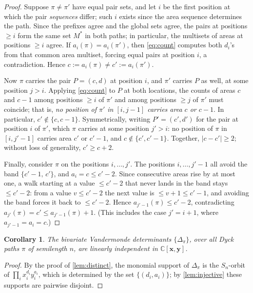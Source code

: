 \documentclass[12pt,reqno]{amsart}
\newtheorem{cor}{Corollary}
\theoremstyle{definition}
\newcommand{\C}{\mathbb C}
\newcommand{\x}{\mathbf x}
\newcommand{\y}{\mathbf y}
\begin{document}
\begin{proof}
Suppose $\pi \neq \pi'$ have equal pair sets, and let $i$ be the first position at which the pair \emph{sequences} differ; such $i$ exists since the area sequence determines the path. Since the prefixes agree and the global sets agree, the pairs at positions $\geq i$ form the same set $M^\ast$ in both paths; in particular, the multisets of areas at positions $\geq i$ agree. If $a_i(\pi) = a_i(\pi')$, then \eqref{eq:count} computes both $d_i$'s from that common area multiset, forcing equal pairs at position $i$, a contradiction. Hence $c := a_i(\pi) \neq c' := a_i(\pi')$.

Now $\pi$ carries the pair $P = (c, d)$ at position $i$, and $\pi'$ carries $P$ as well, at some position $j > i$. Applying \eqref{eq:count} to $P$ at both locations, the counts of areas $c$ and $c-1$ among positions $\geq i$ of $\pi'$ and among positions $\geq j$ of $\pi'$ must coincide; that is, \emph{no position of $\pi'$ in $[i, j-1]$ carries area $c$ or $c-1$}. In particular, $c' \notin \{c, c-1\}$. Symmetrically, writing $P' = (c', d')$ for the pair at position $i$ of $\pi'$, which $\pi$ carries at some position $j' > i$: no position of $\pi$ in $[i, j'-1]$ carries area $c'$ or $c'-1$, and $c \notin \{c', c'-1\}$. Together, $|c - c'| \geq 2$; without loss of generality, $c' \geq c + 2$.

Finally, consider $\pi$ on the positions $i, \dots, j'$. The positions $i, \dots, j'-1$ all avoid the band $\{c'-1,\, c'\}$, and $a_i = c \leq c' - 2$. Since consecutive areas rise by at most one, a walk starting at a value $\leq c'-2$ that never lands in the band stays $\leq c'-2$: from a value $v \leq c'-2$ the next value is $\leq v + 1 \leq c'-1$, and avoiding the band forces it back to $\leq c'-2$. Hence $a_{j'-1}(\pi) \leq c'-2$, contradicting $a_{j'}(\pi) = c' \leq a_{j'-1}(\pi) + 1$. (This includes the case $j' = i+1$, where $a_{j'-1} = a_i = c$.)
\end{proof}

\begin{cor}\label{cor:independent}
The bivariate Vandermonde determinants $\{\Delta_\pi\}$, over all Dyck paths $\pi$ of semilength $n$, are linearly independent in $\C[\x,\y]$.
\end{cor}

\begin{proof}
By the proof of \cref{lem:distinct}, the monomial support of $\Delta_\pi$ is the $S_n$-orbit of $\prod_i x_i^{d_i} y_i^{a_i}$, which is determined by the set $\{(d_i, a_i)\}$; by \cref{lem:injective} these supports are pairwise disjoint.
\end{proof}
\end{document}
